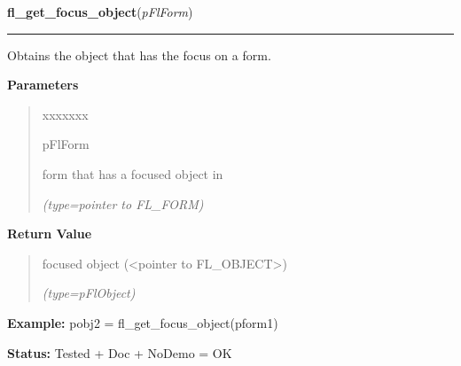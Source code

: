\hspace{.8\funcindent}\begin{boxedminipage}{\funcwidth}

    \raggedright \textbf{fl\_get\_focus\_object}(\textit{pFlForm})

    \vspace{-1.5ex}

    \rule{\textwidth}{0.5\fboxrule}
\setlength{\parskip}{2ex}
    Obtains the object that has the focus on a form.

\setlength{\parskip}{1ex}
      \textbf{Parameters}
      \vspace{-1ex}

      \begin{quote}
        \begin{Ventry}{xxxxxxx}

          \item[pFlForm]

          form that has a focused object in

            {\it (type=pointer to FL\_FORM)}

        \end{Ventry}

      \end{quote}

      \textbf{Return Value}
    \vspace{-1ex}

      \begin{quote}
      focused object ({\textless}pointer to FL\_OBJECT{\textgreater})

      {\it (type=pFlObject)}

      \end{quote}

\textbf{Example:} pobj2 = fl\_get\_focus\_object(pform1)



\textbf{Status:} Tested + Doc + NoDemo = OK



    \end{boxedminipage}

    \label{xformslib:flbasic:fl_reset_focus_object}

    \vspace{0.5ex}

